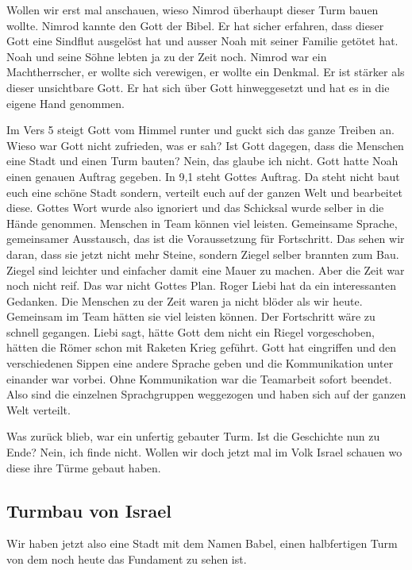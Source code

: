 \documentclass[14pt]{../../inc/mybib}
\begin{document}
    Wollen wir erst mal anschauen, wieso Nimrod überhaupt dieser Turm bauen wollte. Nimrod kannte den Gott der Bibel. Er hat sicher erfahren, dass dieser Gott eine Sindflut ausgelöst hat und ausser Noah mit seiner Familie getötet hat. Noah und seine Söhne lebten ja zu der Zeit noch. Nimrod war ein Machtherrscher, er wollte sich verewigen, er wollte ein Denkmal. Er ist stärker als dieser unsichtbare Gott. Er hat sich über Gott hinweggesetzt und hat es in die eigene Hand genommen.
    
    Im Vers 5 steigt Gott vom Himmel runter und guckt sich das ganze Treiben an. Wieso war Gott nicht zufrieden, was er sah? Ist Gott dagegen, dass die Menschen eine Stadt und einen Turm bauten? Nein, das glaube ich nicht. Gott hatte Noah einen genauen Auftrag gegeben. In 9,1 steht Gottes Auftrag. Da steht nicht \flqq baut euch eine schöne Stadt\frqq{} sondern, \frqq verteilt euch auf der ganzen Welt und bearbeitet diese.\frqq{} Gottes Wort wurde also ignoriert und das Schicksal wurde selber in die Hände genommen. Menschen in Team können viel leisten. Gemeinsame Sprache, gemeinsamer Ausstausch, das ist die Voraussetzung für Fortschritt. Das sehen wir daran, dass sie jetzt nicht mehr Steine, sondern Ziegel selber brannten zum Bau. Ziegel sind leichter und einfacher damit eine Mauer zu machen.  Aber die Zeit war noch nicht reif. Das war nicht Gottes Plan. Roger Liebi hat da ein interessanten Gedanken. Die Menschen zu der Zeit waren ja nicht blöder als wir heute. Gemeinsam im Team hätten sie viel leisten können. Der Fortschritt wäre zu schnell gegangen. Liebi sagt, hätte Gott dem nicht ein Riegel vorgeschoben, hätten die Römer schon mit Raketen Krieg geführt. Gott hat eingriffen und den verschiedenen Sippen eine andere Sprache geben und die Kommunikation unter einander war vorbei. Ohne Kommunikation war die Teamarbeit sofort beendet. Also sind die einzelnen Sprachgruppen weggezogen und haben sich auf der ganzen Welt verteilt.

    Was zurück blieb, war ein unfertig gebauter Turm. Ist die Geschichte nun zu Ende? Nein, ich finde nicht. Wollen wir doch jetzt mal im Volk Israel schauen wo diese ihre Türme gebaut haben.
    
    \subsection{Turmbau von Israel}
    Wir haben jetzt also eine Stadt mit dem Namen Babel, einen halbfertigen Turm von dem noch heute das Fundament zu sehen ist. 
\end{document}
